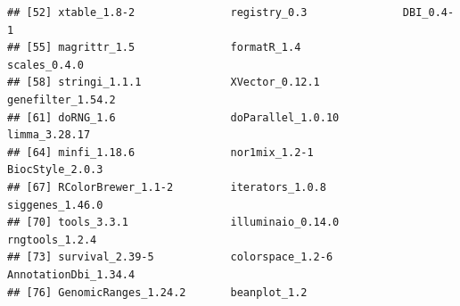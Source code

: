 \documentclass{article}\usepackage[]{graphicx}\usepackage[usenames,dvipsnames]{color}
\makeatletter
\newenvironment{kframe}{%
 \def\at@end@of@kframe{}%
 \ifinner\ifhmode%
  \def\at@end@of@kframe{\end{minipage}}%
  \begin{minipage}{\columnwidth}%
 \fi\fi%
 \def\FrameCommand##1{\hskip\@totalleftmargin \hskip-\fboxsep
 \colorbox{shadecolor}{##1}\hskip-\fboxsep
     \hskip-\linewidth \hskip-\@totalleftmargin \hskip\columnwidth}%
 \MakeFramed {\advance\hsize-\width
   \@totalleftmargin\z@ \linewidth\hsize
   \@setminipage}}%
 {\par\unskip\endMakeFramed%
 \at@end@of@kframe}
\newenvironment{knitrout}{}{} %
\makeatother
\begin{document}
\begin{knitrout}
\begin{kframe}
\begin{verbatim}
## [52] xtable_1.8-2               registry_0.3               DBI_0.4-1                 
## [55] magrittr_1.5               formatR_1.4                scales_0.4.0              
## [58] stringi_1.1.1              XVector_0.12.1             genefilter_1.54.2         
## [61] doRNG_1.6                  doParallel_1.0.10          limma_3.28.17             
## [64] minfi_1.18.6               nor1mix_1.2-1              BiocStyle_2.0.3           
## [67] RColorBrewer_1.1-2         iterators_1.0.8            siggenes_1.46.0           
## [70] tools_3.3.1                illuminaio_0.14.0          rngtools_1.2.4            
## [73] survival_2.39-5            colorspace_1.2-6           AnnotationDbi_1.34.4      
## [76] GenomicRanges_1.24.2       beanplot_1.2
\end{verbatim}
\end{kframe}
\end{knitrout}


\end{document}
